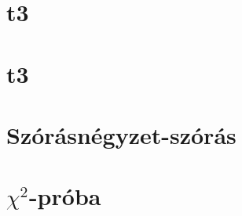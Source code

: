 \begin{spacing}{1.4}
\section*{t3} \label{DBparegymutf3}
\Fa{

}
\vspace{0.5cm}
\newpage
\section*{t3} \label{DBparegymutf3Mo}
\Mo{

}
\vspace{0.5cm}
\newpage
\section*{Szórásnégyzet-szórás} \label{DBparegysigma}
\vspace{0.5cm}
\newpage
\section*{$\chi^2$-próba} \label{DBparegysigmachi2}
\Desc{

}
\vspace{0.5cm}
\newpage

\end{spacing}


